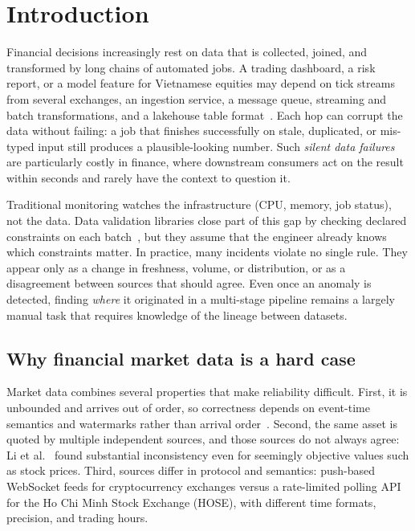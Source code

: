 %

\section{Introduction}
\label{sec:introduction}

Financial decisions increasingly rest on data that is collected, joined, and
transformed by long chains of automated jobs. A trading dashboard, a risk report,
or a model feature for Vietnamese equities may depend on tick streams from several
exchanges, an ingestion service, a message queue, streaming and batch
transformations, and a lakehouse table format~\cite{armbrust2021lakehouse}.
Each hop can corrupt the data without failing: a job that finishes
successfully on stale, duplicated, or mis-typed input still produces a
plausible-looking number. Such \emph{silent data failures} are particularly costly
in finance, where downstream consumers act on the result within seconds and
rarely have the context to question it.

Traditional monitoring watches the infrastructure (CPU, memory, job status), not
the data. Data validation libraries close part of this gap by checking declared
constraints on each batch~\cite{schelter2018automating}, but they assume that the
engineer already knows which constraints matter. In practice, many incidents
violate no single rule. They appear only as a change in freshness, volume, or
distribution, or as a disagreement between sources that should agree. Even once an
anomaly is detected, finding \emph{where} it originated in a multi-stage pipeline
remains a largely manual task that requires knowledge of the lineage between
datasets.

\subsection{Why financial market data is a hard case}

Market data combines several properties that make reliability difficult.
First, it is unbounded and arrives out of order, so correctness depends on
event-time semantics and watermarks rather than arrival order~\cite{akidau2015dataflow}.
Second, the same asset is quoted by multiple independent sources, and those
sources do not always agree: Li et al.~\cite{li2012truth} found substantial
inconsistency even for seemingly objective values such as stock prices.
Third, sources differ in protocol and semantics: push-based WebSocket feeds for
cryptocurrency exchanges versus a rate-limited polling API for the Ho Chi Minh
Stock Exchange (HOSE), with different time formats, precision, and trading hours.

